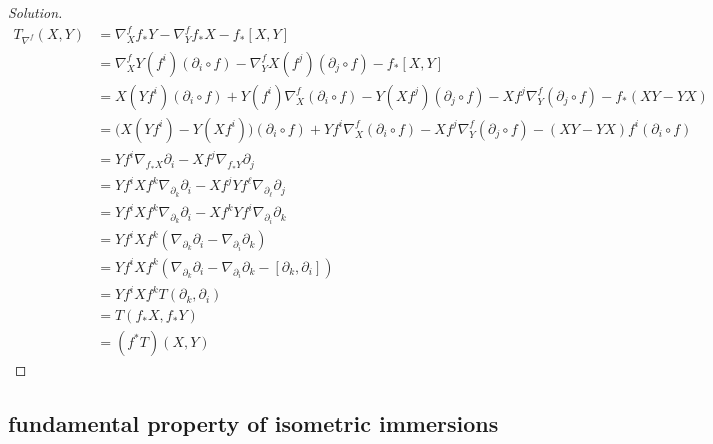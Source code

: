 \begin{proof}[Solution]

\begin{align*}
	T_{\nabla^f}(X,Y)&=\nabla^f_X f_*Y-\nabla^f_Yf_*X-f_*[X,Y]\\
			 &=\nabla^f_XY(f^i)(\partial_i \circ f)-\nabla^f_YX(f^j)(\partial_j\circ f)-f_*[X,Y]\\
			 &=X(Yf^i)(\partial_i \circ f)+Y(f^i)\nabla^f_X(\partial_i \circ f)-Y(Xf^j)(\partial_j\circ f)-Xf^j \nabla^f_Y (\partial_j \circ f)-f_*(XY-YX)\\
			 &=\Big(X(Yf^i)-Y(Xf^i)\Big)(\partial_i \circ f)+Yf^i\nabla^f_X(\partial_i \circ f)-Xf^j\nabla^f_Y(\partial_j \circ f)-(XY-YX)f^i(\partial_i \circ f)\\
			 &=Yf^i \nabla_{f_*X}\partial_i-Xf^j \nabla_{f_*Y}\partial_j\\
&=Yf^iXf^k\nabla_{\partial_k}\partial_i-Xf^jYf^\ell \nabla_{\partial_\ell}\partial_j\\
&=Yf^iXf^k \nabla_{\partial_k}\partial_i-Xf^kYf^i \nabla_{\partial_i}\partial_k\\
&=Yf^iXf^k(\nabla_{\partial_k}\partial_i-\nabla_{\partial_i}\partial_k)\\
&=Yf^iXf^k(\nabla_{\partial_k}\partial_i-\nabla_{\partial_i}\partial_k-[\partial_k,\partial_i])\\
&=Yf^iXf^kT(\partial_k,\partial_i)\\
&=T(f_*X,f_*Y)\\
&=(f^*T)(X,Y)
\end{align*}
\end{proof}

\subsection{fundamental property of isometric immersions}

